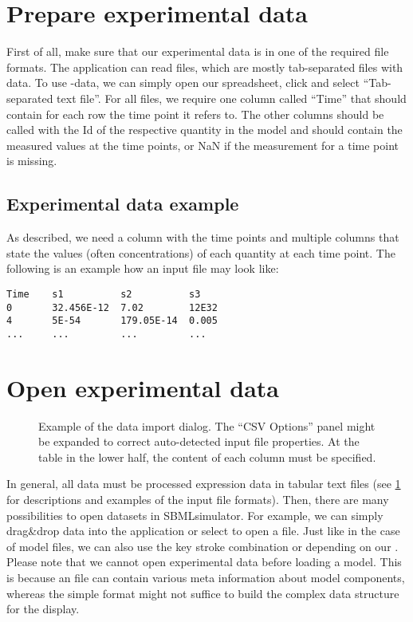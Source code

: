 \section{Prepare experimental data}
\label{ch:prepare}

First of all, make sure that our experimental data is in one of the required file formats.
The application can read \CSV files, which are mostly tab-separated files with data.
To use \Excel-data, we can simply open our \Excel spreadsheet, click  and select ``Tab-separated text file''.
For all files, we require one column called ``Time'' that should contain for each row the time point it refers to.
The other columns should be called with the \ac{Id} of the respective quantity in the model and should contain the measured values at the time points, or \ac{NaN} if the measurement for a time point is missing. 

\subsection{Experimental data example}
As described, we need a column with the time points and multiple columns that state the values (often concentrations) of each quantity at each time point.
The following is an example how an input file may look like:
\begin{lstlisting}[caption={Input file example for experimental data},label={lst:input:exp},numbers=none,captionpos=t,float=h]
Time    s1          s2          s3
0       32.456E-12  7.02        12E32
4       5E-54       179.05E-14  0.005
...     ...         ...         ...
\end{lstlisting}

\section{Open experimental data}
\label{sec:opendata}
\begin{figure}[h]
\centering
{}
\caption[Example of the data import dialog]{Example of the data import dialog.
The ``CSV Options'' panel might be expanded to correct auto-detected input file properties.
At the table in the lower half, the content of each column must be specified.}
\label{fig:inputdialog}
\end{figure}
In general, all data must be processed expression data in tabular text files (see \cref{ch:prepare} for descriptions and examples of the input file formats).
Then, there are many possibilities to open datasets in SBMLsimulator.
For example, we can simply drag\&drop data into the application or select  to open a file.
Just like in the case of model files, we can also use the key stroke combination  or  depending on our \OS.
Please note that we cannot open experimental data before loading a model.
This is because an \SBML file can contain various meta information about model components, whereas the simple \CSV format might not suffice to build the complex data structure for the display.

